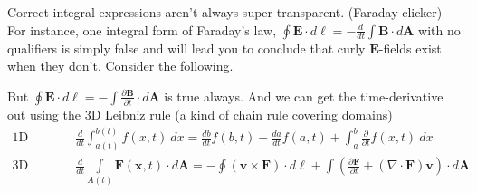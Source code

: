 \documentclass{article}
\begin{document}
Correct integral expressions aren't always super transparent. (\iclicker[scale=0.28]Faraday clicker) For instance, one integral form of Faraday's law, $\displaystyle \oint \bm{E} \cdot d\bm{\ell} = -\frac{d}{dt} \int \bm{B} \cdot d\bm{A}$ with no qualifiers is simply false and will lead you to conclude that curly $\bm{E}$-fields exist when they don't. Consider the following.

\begin{figure}[H]
\centering
{}
\end{figure}

But $\displaystyle \oint \bm{E} \cdot d\bm{\ell} = -\int \frac{\partial \bm{B}}{\partial t} \cdot d\bm{A}$ is true always. And we can get the time-derivative out using the 3D Leibniz rule (a kind of chain rule covering domains)
\begin{align*}
    \text{1D Leibniz Rule:}\quad& \frac{d}{dt} \int_{a(t)}^{b(t)} f(x,t)\ dx = \frac{db}{dt} f(b,t) - \frac{da}{dt} f(a,t) + \int_a^b \frac{\partial}{\partial t} f(x, t)\ dx \\
    \text{3D Leibniz Rule:}\quad& \frac{d}{dt} \int\limits_{A(t)} \bm{F}(\bm{x}, t) \cdot d\bm{A} = -\oint \left( \bm{v} \times \bm{F} \right) \cdot d\bm{\ell} + \int \left( \frac{\partial \bm{F}}{\partial t} + \left( \nabla \cdot \bm{F} \right) \bm{v} \right) \cdot d\bm{A}
\end{align*}
\end{document}
